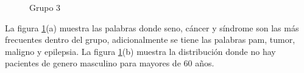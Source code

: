 \begin{figure}[h!]
	\centering
	\caption{Grupo 3} \label{fig:c3}
\end{figure}

La figura \ref{fig:c3}(a)  muestra las palabras donde seno, cáncer y síndrome son las más frecuentes dentro del grupo, adicionalmente se tiene las palabras pam, tumor, maligno y epilepsia. La figura \ref{fig:c3}(b) muestra la distribución donde no hay pacientes de genero masculino para mayores de 60 años.  

